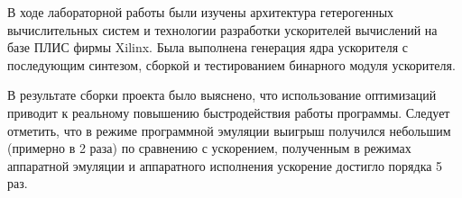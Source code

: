 \Conclusion

В ходе лабораторной работы были изучены архитектура гетерогенных вычислительных систем и технологии разработки ускорителей вычислений на базе ПЛИС фирмы Xilinx. Была выполнена генерация ядра ускорителя с последующим синтезом, сборкой и тестированием бинарного модуля ускорителя.

В результате сборки проекта было выяснено, что использование оптимизаций приводит к реальному повышению быстродействия работы программы. Следует отметить, что в режиме программной эмуляции выигрыш получился небольшим (примерно в 2 раза) по сравнению с ускорением, полученным в режимах аппаратной эмуляции и аппаратного исполнения ускорение достигло порядка 5 раз.
